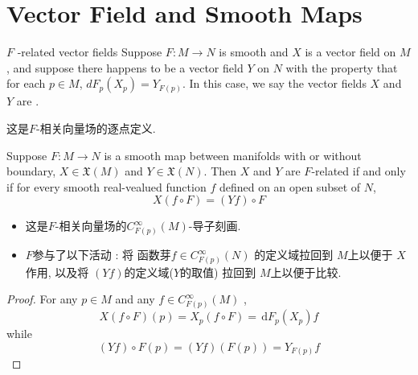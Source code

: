 \documentclass[../main.tex]{subfiles}
\begin{document}
\section{Vector Field and Smooth Maps}

\begin{definition}{\(  F  \) -related vector fields}{}
    Suppose $F:M\to N$ is smooth and $X$ is a vector field on $M$, and suppose there happens to be a vector field $Y$ on $N$ with the property that for each $p\in M$, $dF_{p}(X_{p})=Y_{F(p)}$. In this case, we say the vector fields $X$ and $Y$ are .
\end{definition}

\begin{remark}
    这是\(  F  \)-相关向量场的逐点定义. 
\end{remark}

\begin{proposition}{}{}
    Suppose \(  F:M\to N  \) is a smooth map between manifolds with or without boundary, \(  X \in \mathfrak{X}\left( M \right)   \) and \(  Y\in \mathfrak{X}\left( N \right)   \). Then \(  X  \) and \(  Y  \) are \(  F  \)-related if and only if for every smooth real-vealued function \(  f  \) defined on an open subset of \(  N  \), \[
    X\left( f\circ F \right)= \left( Yf \right)\circ F  
    \]        
\end{proposition}

\begin{remark}
    \begin{itemize}
        \item 这是\(  F  \)-相关向量场的\(  C_{F\left( p \right) }^{\infty}\left( M \right)   \)-导子刻画.    
        \item \(  F  \)参与了以下活动 : 将 函数芽\(  f \in C_{F\left( p \right) }^{\infty}\left( N \right)   \) 的定义域拉回到 \(  M  \)上以便于 \(  X  \)作用, 以及将 \(  \left( Yf \right)   \)的定义域(\(  Y  \)的取值) 拉回到 \(  M  \)上以便于比较.
    \end{itemize}
\end{remark}

\begin{proof}
    For any \(  p \in M  \) and any \(  f\in C^{\infty}_{F\left( p \right) }\left( M \right)   \)  , \[
    X\left( f\circ F \right) \left( p \right) = X_{p}\left( f\circ F \right)= \,\mathrm{d} F_{p}\left( X_{p} \right)f  
    \]while \[
    \left( Yf \right)\circ F\left( p \right)= \left( Yf \right)\left( F\left( p \right)  \right)= Y_{F\left( p \right) }f    
    \]
\end{proof}
\end{document}
